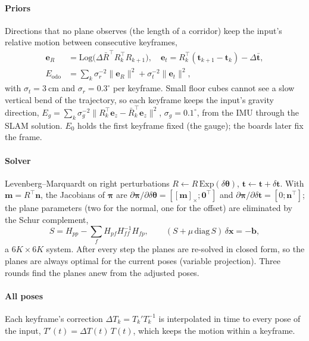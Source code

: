 \paragraph{Priors} Directions that no plane observes (the length of a
corridor) keep the input's relative motion between consecutive keyframes,
\begin{equation}
\begin{aligned}
\mathbf e_R&=\mathrm{Log}\big(\Delta\bar R^\top R_k^\top R_{k+1}\big),\quad
\mathbf e_t=R_k^\top(\mathbf t_{k+1}-\mathbf t_k)-\Delta\bar{\mathbf t},\\
E_{\mathrm{odo}}&=\textstyle\sum_k \sigma_r^{-2}\|\mathbf e_R\|^2+\sigma_t^{-2}\|\mathbf e_t\|^2,
\end{aligned}
\end{equation}
with $\sigma_t=\SI{3}{\centi\metre}$ and $\sigma_r=0.3^\circ$ per keyframe.
Small floor cubes cannot see a slow vertical bend of the trajectory, so
each keyframe keeps the input's gravity direction,
$E_g=\sum_k\sigma_g^{-2}\|R_k^\top\mathbf e_z-\bar R_k^\top\mathbf e_z\|^2$,
$\sigma_g=0.1^\circ$, from the IMU through the SLAM solution. $E_0$ holds
the first keyframe fixed (the gauge); the boards later fix the frame.

\paragraph{Solver} Levenberg--Marquardt on right perturbations
$R\leftarrow R\,\mathrm{Exp}(\delta\boldsymbol\theta)$,
$\mathbf t\leftarrow\mathbf t+\delta\mathbf t$. With
$\mathbf m=R^\top\mathbf n$, the Jacobians of $\boldsymbol\pi$ are
$\partial\boldsymbol\pi/\partial\delta\boldsymbol\theta=[[\mathbf m]_\times;\mathbf 0^\top]$
and $\partial\boldsymbol\pi/\partial\delta\mathbf t=[0;\mathbf n^\top]$; the
plane parameters (two for the normal, one for the offset) are eliminated by
the Schur complement,
\begin{equation}
S=H_{pp}-\textstyle\sum_f H_{pf}H_{ff}^{-1}H_{fp},\qquad
(S+\mu\,\mathrm{diag}\,S)\,\delta\mathbf x=-\mathbf b ,
\end{equation}
a $6K\times6K$ system. After every step the planes are re-solved in closed
form, so the planes are always optimal for the current poses (variable
projection). Three rounds find the planes anew from the adjusted poses.

\paragraph{All poses} Each keyframe's correction
$\Delta T_k=T_k'T_k^{-1}$ is interpolated in time to every pose of the input,
$T'(t)=\Delta T(t)\,T(t)$, which keeps the motion within a keyframe.

